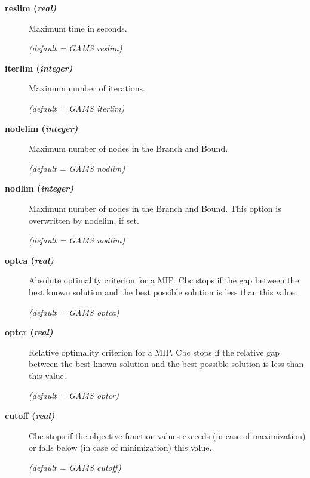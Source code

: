\begin{description}
\item[\label{reslim}\hypertarget{reslim}
{\textbf{reslim (\slshape{real})}}]\hspace{1.0in}

Maximum time in seconds.

\textsl{(default = GAMS reslim)}

\item[\label{iterlim}\hypertarget{iterlim}
{\textbf{iterlim (\slshape{integer})}}]\hspace{1.0in}

Maximum number of iterations.

\textsl{(default = GAMS iterlim)}

\item[\label{nodelim}\hypertarget{nodelim}
{\textbf{nodelim (\slshape{integer})}}]\hspace{1.0in}

Maximum number of nodes in the Branch and Bound.

\textsl{(default = GAMS nodlim)}

\item[\label{nodlim}\hypertarget{nodlim}
{\textbf{nodlim (\slshape{integer})}}]\hspace{1.0in}

Maximum number of nodes in the Branch and Bound.
This option is overwritten by nodelim, if set.

\textsl{(default = GAMS nodlim)}

\item[\label{optca}\hypertarget{optca}
{\textbf{optca (\slshape{real})}}]\hspace{1.0in}

Absolute optimality criterion for a MIP.
Cbc stops if the gap between the best known solution and the best possible solution is less than this value.

\textsl{(default = GAMS optca)}

\item[\label{optcr}\hypertarget{optcr}
{\textbf{optcr (\slshape{real})}}]\hspace{1.0in}

Relative optimality criterion for a MIP.
Cbc stops if the relative gap between the best known solution and the best possible solution is less than this value.

\textsl{(default = GAMS optcr)}

\item[\label{cutoff}\hypertarget{cutoff}
{\textbf{cutoff (\slshape{real})}}]\hspace{1.0in}

Cbc stops if the objective function values exceeds (in case of maximization) or falls below (in case of minimization) this value.

\textsl{(default = GAMS cutoff)}
\end{description}
